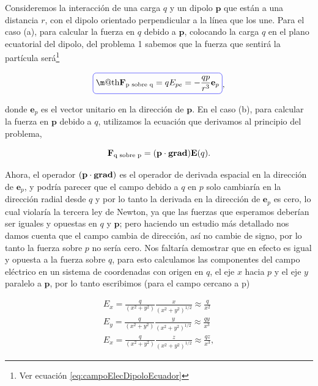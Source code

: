 \documentclass[a4paper,11pt]{article}
\makeatletter
\numberwithin{equation}{section}
\newcommand*{\boxcolor}{blue}
\renewcommand{\boxed}[1]{\textcolor{\boxcolor}{%
\tikz[baseline={([yshift=-1ex]current bounding box.center)}] \node [rectangle, minimum width=1ex,rounded corners,draw] {\normalcolor\m@th$\displaystyle#1$};}}
\makeatother
\begin{document}
Consideremos la interacción de una carga $q$ y un dipolo 
$\mathbf{p}$ que están a una distancia $r$, con el dipolo orientado perpendicular a 
la línea que los une. Para el caso (a), para calcular la fuerza en $q$ debido a 
$\mathbf{p}$, colocando la carga $q$ en el plano ecuatorial del dipolo, del problema 
1 sabemos que la fuerza que sentirá la partícula será\footnote{Ver ecuación 
\eqref{eq:campoElecDipoloEcuador}}

\begin{equation}
 \boxed{\mathbf{F}_{\text{p sobre q}} = q E_{pe} = - \frac{qp}{r^3}\mathbf{e}_p},
 \label{eq:dipoloPsobreQ}
\end{equation}

donde $\mathbf{e}_p$ es el vector unitario en la dirección de $\mathbf{p}$. En 
el caso (b), para calcular la fuerza en $\mathbf{p}$ debido a $q$, utilizamos 
la ecuación que derivamos al principio del problema, 

\begin{equation}
 \mathbf{F}_{\text{q sobre p}} = (\mathbf{p}\cdot \text{\textbf{grad}})\mathbf{E}(q).
\end{equation}

Ahora, el operador $(\mathbf{p}\cdot \text{\textbf{grad}})$ es el operador de 
derivada espacial en la dirección de $\mathbf{e}_p$, y podría parecer que el campo 
debido a $q$ en $p$ solo cambiaría en la dirección radial desde $q$ y por lo tanto 
la derivada en la dirección de $\mathbf{e}_p$ es cero, lo cual violaría la tercera 
ley de Newton, ya que las fuerzas que esperamos deberían ser iguales y opuestas en 
$q$ y $\mathbf{p}$; pero haciendo un estudio más detallado nos damos cuenta que 
el campo cambia de dirección, así no cambie de signo, por lo tanto la fuerza 
sobre $p$ no sería cero. Nos faltaría demostrar que en efecto es igual y opuesta 
a la fuerza sobre $q$, para esto calculamos las componentes del campo eléctrico 
en un sistema de coordenadas con origen en $q$, el eje $x$ hacia $p$ y el eje 
$y$ paralelo a $\mathbf{p}$, por lo tanto escribimos (para el campo cercano a p)

\begin{align*}
 E_x = \frac{q}{(x^2+y^2)}\frac{x}{(x^2+y^2)^{1/2}} \approx \frac{q}{x^2} \\
 E_y = \frac{q}{(x^2+y^2)}\frac{y}{(x^2+y^2)^{1/2}} \approx \frac{qy}{x^3} \\
 E_x = \frac{q}{(x^2+y^2)}\frac{z}{(x^2+y^2)^{1/2}} \approx \frac{qz}{x^3},
\end{align*}
\end{document}
